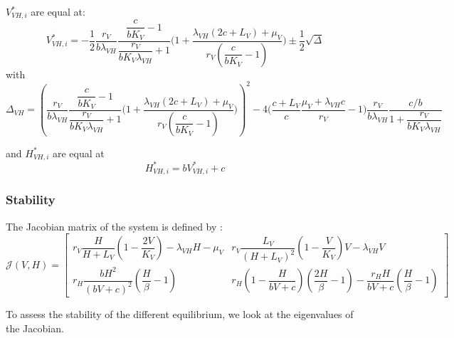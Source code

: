 \documentclass{article}
\newcommand{\lv}{\lambda_{VH}}
\begin{document}
$V^{*}_{VH,i}$ are equal at:
\begin{equation}
V^{*}_{VH,i} = -\dfrac{1}{2}\dfrac{r_V}{b\lv} \dfrac{\dfrac{c}{bK_V} -1}{\dfrac{r_V}{b K_V \lv} +1} \Big(1+ \dfrac{\lv(2c+L_V) + \mu_V}{r_V(\dfrac{c}{bK_V} -1) } \Big) \pm \dfrac{1}{2} \sqrt{\Delta}
\label{equilibreVH:V}
\end{equation}
with $\Delta_{VH} = \left(\dfrac{r_V}{b\lv} \dfrac{\dfrac{c}{bK_V} -1}{\dfrac{r_V}{b K_V \lv} +1} \Big(1+ \dfrac{\lv(2c+L_V) + \mu_V}{r_V(\dfrac{c}{bK_V} -1) } \Big) \right)^2 - 4\Big(\dfrac{c+L_V}{c} \dfrac{\mu_V + \lv c}{r_V} - 1\Big)\dfrac{r_V}{b\lv} \dfrac{c/b}{1 + \dfrac{r_V}{b K_V \lv}} $

and $H^*_{VH,i}$ are equal at
\begin{equation}
H^*_{VH,i} = b V^*_{VH,i} + c
\label{equilibreVH:H}
\end{equation}

\subsubsection{Stability}
The Jacobian matrix of the system is defined by :
\begin{equation}
\mathcal{J}(V,H) =  \begin{bmatrix}
r_V \dfrac{H}{H+L_V}(1-\dfrac{2V}{K_V}) - \lv H - \mu_V & r_V \dfrac{L_V}{(H+L_V)^2}(1-\dfrac{V}{K_V})V  - \lv V\\
r_H \dfrac{bH^2}{(bV+c)^2} (\dfrac{H}{\beta}-1) & r_H(1-\dfrac{H}{bV+c})(\dfrac{2H}{\beta}-1) - \dfrac{r_H H}{bV+c}(\dfrac{H}{\beta}-1)
\end{bmatrix}
\label{stabilityVH:jacobianVH}
\end{equation}

To assess the stability of the different equilibrium, we look at the eigenvalues of the Jacobian.
\end{document}
